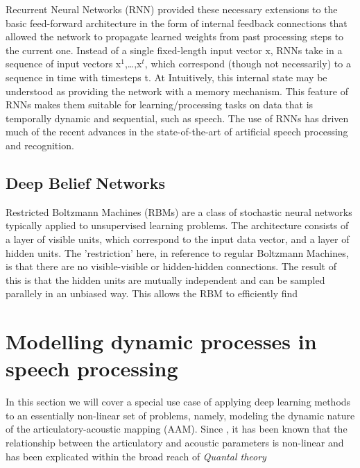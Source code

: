 \documentclass{article}[12pt]
\begin{document}
Recurrent Neural Networks (RNN) \cite{rumelhart1986} provided these necessary extensions to the basic feed-forward architecture in the form of internal feedback connections that allowed the network to propagate learned weights from past processing steps to the current one. Instead of a single fixed-length input vector x, RNNs take in a sequence of input vectors x$^1$,\ldots,x$^t$, which correspond (though not necessarily) to a sequence in time with timesteps t. At Intuitively, this internal state may be understood as providing the network with a memory mechanism. This feature of RNNs makes them suitable for learning/processing tasks on data that is temporally dynamic and sequential, such as speech. The use of RNNs has driven much of the recent advances in the state-of-the-art of artificial speech processing and recognition.

\subsection{Deep Belief Networks}
Restricted Boltzmann Machines (RBMs) are a class of stochastic neural networks typically applied to unsupervised learning problems. The architecture consists of a layer of visible units, which correspond to the input data vector, and a layer of hidden units. The 'restriction' here, in reference to regular Boltzmann Machines, is that there are no visible-visible or hidden-hidden connections. The result of this is that the hidden units are mutually independent and can be sampled parallely in an unbiased way. This allows the RBM to efficiently find



\section{Modelling dynamic processes in speech processing}
In this section we will cover a special use case of applying deep learning methods to an essentially non-linear set of problems, namely, modeling the dynamic nature of the articulatory-acoustic mapping (AAM). Since \cite{stevens1968}, it has been known that the relationship between the articulatory and acoustic parameters is non-linear and has been explicated within the broad reach of \emph{Quantal theory} \citep{stevens1968}
\end{document}
